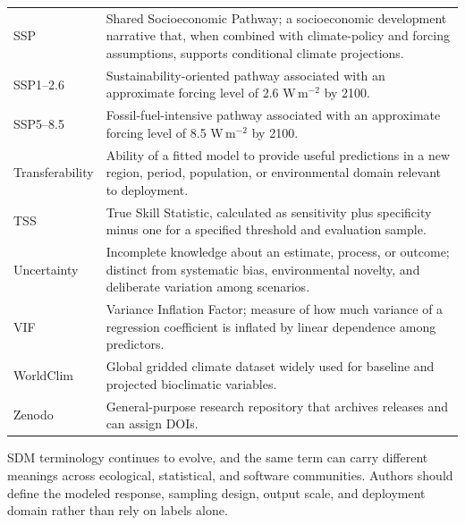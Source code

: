 \begin{longtable}{p{}p{}}
SSP & Shared Socioeconomic Pathway; a socioeconomic development narrative that, when combined with climate-policy and forcing assumptions, supports conditional climate projections. \\
SSP1--2.6 & Sustainability-oriented pathway associated with an approximate forcing level of 2.6 W\,m\(^{-2}\) by 2100. \\
SSP5--8.5 & Fossil-fuel-intensive pathway associated with an approximate forcing level of 8.5 W\,m\(^{-2}\) by 2100. \\
Transferability & Ability of a fitted model to provide useful predictions in a new region, period, population, or environmental domain relevant to deployment. \\
TSS & True Skill Statistic, calculated as sensitivity plus specificity minus one for a specified threshold and evaluation sample. \\
Uncertainty & Incomplete knowledge about an estimate, process, or outcome; distinct from systematic bias, environmental novelty, and deliberate variation among scenarios. \\
VIF & Variance Inflation Factor; measure of how much variance of a regression coefficient is inflated by linear dependence among predictors. \\
WorldClim & Global gridded climate dataset widely used for baseline and projected bioclimatic variables. \\
Zenodo & General-purpose research repository that archives releases and can assign DOIs. \\
\bottomrule
\end{longtable}

\begin{conceito}[title={\faBook\quad Terminology evolves}]
SDM terminology continues to evolve, and the same term can carry different meanings across ecological, statistical, and software communities. Authors should define the modeled response, sampling design, output scale, and deployment domain rather than rely on labels alone.
\end{conceito}
